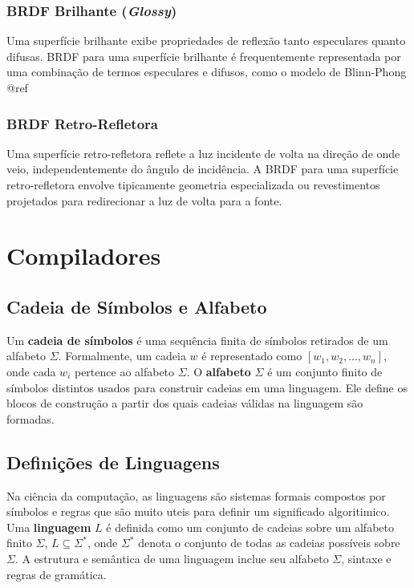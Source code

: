 \documentclass[english, 
               brazil, 
               bsc] %
               {dcomp-abntex2}
\begin{document}
\subsubsection{BRDF Brilhante (\textit{Glossy})}
Uma superfície brilhante exibe propriedades de reflexão tanto especulares quanto difusas. BRDF para uma superfície brilhante é frequentemente representada por uma combinação de termos especulares e difusos, como o modelo de Blinn-Phong @ref

\subsubsection{BRDF Retro-Refletora}
Uma superfície retro-refletora reflete a luz incidente de volta na direção de onde veio, independentemente do ângulo de incidência. A BRDF para uma superfície retro-refletora envolve tipicamente geometria especializada ou revestimentos projetados para redirecionar a luz de volta para a fonte.

\section{Compiladores} \label{compiladores}

\subsection{Cadeia de Símbolos e Alfabeto} \label{simbolos}

Um \textbf{cadeia de símbolos} é uma sequência finita de símbolos retirados de um alfabeto $ \Sigma $. Formalmente, um cadeia $ w $ é representado como $ [w_1, w_2, ..., w_n] $, onde cada $ w_i $ pertence ao alfabeto $ \Sigma $. O \textbf{alfabeto} $ \Sigma $ é um conjunto finito de símbolos distintos usados para construir cadeias em uma linguagem. Ele define os blocos de construção a partir dos quais cadeias válidas na linguagem são formadas.

\subsection{Definições de Linguagens} \label{linguagem}

Na ciência da computação, as linguagens são sistemas formais compostos por símbolos e regras que são muito uteis para definir um significado algoritimico. Uma \textbf{linguagem} $L$ é definida como um conjunto de cadeias sobre um alfabeto finito $ \Sigma $, $ L \subseteq \Sigma^* $, onde  $ \Sigma^* $ denota o conjunto de todas as cadeias possíveis sobre $ \Sigma $. A estrutura e semântica de uma linguagem  inclue seu alfabeto $ \Sigma $, sintaxe e regras de gramática.
\end{document}
